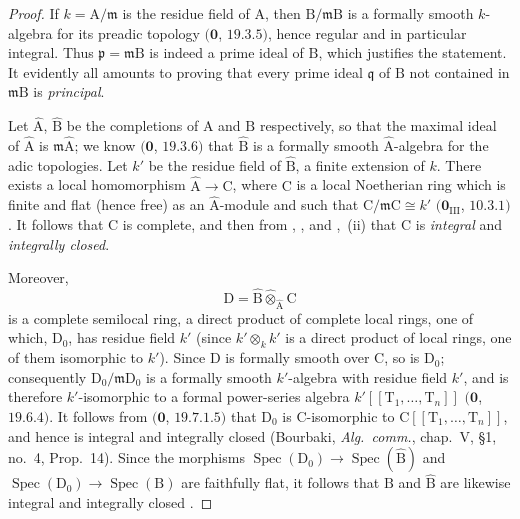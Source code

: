 \begin{proof}
If $k=\mathrm{A}/\mathfrak{m}$ is the residue field of $\mathrm{A}$, then $\mathrm{B}/\mathfrak{m}\mathrm{B}$ is a formally smooth $k$-algebra for its preadic topology $(\mathbf{0}$, $19.3.5)$, hence regular and in particular integral. Thus $\mathfrak{p}=\mathfrak{m}\mathrm{B}$ is indeed a prime ideal of $\mathrm{B}$, which justifies the statement.
It evidently all amounts to proving that every prime ideal $\mathfrak{q}$ of $\mathrm{B}$ not contained in $\mathfrak{m}\mathrm{B}$ is \emph{principal}.

Let $\widehat{\mathrm{A}}$, $\widehat{\mathrm{B}}$ be the completions of $\mathrm{A}$ and $\mathrm{B}$ respectively, so that the maximal ideal of $\widehat{\mathrm{A}}$ is $\mathfrak{m}\widehat{\mathrm{A}}$; we know $(\mathbf{0}$, $19.3.6)$ that $\widehat{\mathrm{B}}$ is a formally smooth $\widehat{\mathrm{A}}$-algebra for the adic topologies.
Let $k'$ be the residue field of $\widehat{\mathrm{B}}$, a finite extension of $k$. There exists a local homomorphism $\widehat{\mathrm{A}}\to\mathrm{C}$, where $\mathrm{C}$ is a local Noetherian ring which is finite and flat (hence free) as an $\widehat{\mathrm{A}}$-module and such that $\mathrm{C}/\mathfrak{m}\mathrm{C}\cong k'$ $(\mathbf{0}_{\mathrm{III}}$, $10.3.1)$. It follows that $\mathrm{C}$ is complete, and then from , , and ,~(ii) that $\mathrm{C}$ is \emph{integral} and \emph{integrally closed}.

Moreover,
\[
  \mathrm{D}=\widehat{\mathrm{B}}\widehat{\otimes}_{\widehat{\mathrm{A}}}\mathrm{C}
\]
is a complete semilocal ring, a direct product of complete local rings, one of which, $\mathrm{D}_0$, has residue field $k'$ (since $k'\otimes_k k'$ is a direct product of local rings, one of them isomorphic to $k'$). Since $\mathrm{D}$ is formally smooth over $\mathrm{C}$, so is $\mathrm{D}_0$; consequently $\mathrm{D}_0/\mathfrak{m}\mathrm{D}_0$ is a formally smooth $k'$-algebra with residue field $k'$, and is therefore $k'$-isomorphic to a formal power-series algebra $k'[[\mathrm{T}_1,\ldots,\mathrm{T}_n]]$ $(\mathbf{0}$, $19.6.4)$. It follows from $(\mathbf{0}$, $19.7.1.5)$ that $\mathrm{D}_0$ is $\mathrm{C}$-isomorphic to $\mathrm{C}[[\mathrm{T}_1,\ldots,\mathrm{T}_n]]$, and hence is integral and integrally closed (Bourbaki, \emph{Alg.\ comm.}, chap.~V, \S1, no.~4, Prop.~14). Since the morphisms $\operatorname{Spec}(\mathrm{D}_0)\to\operatorname{Spec}(\widehat{\mathrm{B}})$ and $\operatorname{Spec}(\mathrm{D}_0)\to\operatorname{Spec}(\mathrm{B})$ are faithfully flat, it follows that $\mathrm{B}$ and $\widehat{\mathrm{B}}$ are likewise integral and integrally closed .


\end{proof}
